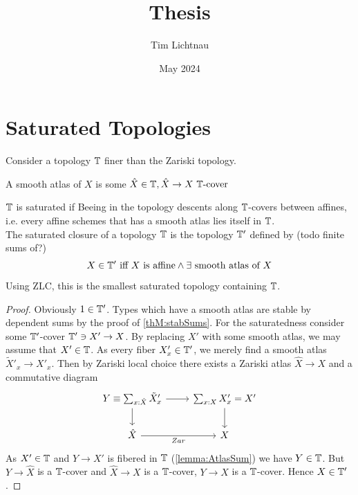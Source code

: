 \documentclass{article}
\title{Thesis}
\author{Tim Lichtnau }
\date{May 2024}
\begin{document}
\maketitle
\section{Saturated Topologies}
Consider a topology $\mathbb{T}$ finer than the Zariski topology.
\begin{definition}
    A smooth atlas of $X$ is  some $\hat X \in \mathbb{T} , \hat X \to X \text{ $\mathbb{T}$-cover }$
    \end{definition}
\begin{definition}
     $\mathbb{T}$ is saturated if Beeing in the topology descents along $\mathbb{T}$-covers between affines, i.e. every affine schemes that has a smooth atlas lies itself in $\mathbb{T}$. \\
    The saturated closure of a topology $\mathbb{T}$ is the topology $\mathbb{T}'$ defined by (todo finite sums of?)
    \[
    X \in \mathbb{T}' \text{ iff $X$ is affine} \land \exists \text{ smooth atlas of } X 
    \]
\end{definition}
\begin{lemma}
    Using ZLC, this is the smallest saturated topology containing $\mathbb{T}$.
\end{lemma}
\begin{proof}
Obviously $1 \in \mathbb{T}'$. Types which have a smooth atlas are stable by dependent sums by the proof of \ref{thM:stabSums}. For the saturatedness consider some $\mathbb{T}'$-cover $\mathbb{T}' \ni X' \to X$. By replacing $X'$ with some smooth atlas, we may assume that $X' \in \mathbb{T}$. As every fiber $X'_x \in \mathbb{T}'$, we merely find a smooth atlas $\tilde X'_x \to X'_x$. Then by Zariski local choice there exists a Zariski atlas $\hat X \to X$ and a commutative diagram 
\[\begin{tikzcd}
	Y \equiv {\sum_{x : \hat X}\tilde X'_x} & {\sum_{x : X}X'_x} = X' \\
	{\hat X} & X
	\arrow[from=1-1, to=1-2]
	\arrow[from=1-1, to=2-1]
	\arrow[from=1-2, to=2-2]
	\arrow["Zar"', from=2-1, to=2-2]
\end{tikzcd}\]
As $X' \in \mathbb{T}$ and $Y \to X'$ is fibered in $\mathbb{T}$ (\ref{lemma:AtlasSum}) we have $Y \in \mathbb{T}$. But $Y \to \hat X$ is a $\mathbb{T}$-cover and $\hat X \to X$ is a $\mathbb{T}$-cover, $Y \to X$ is a $\mathbb{T}$-cover. Hence $X \in \mathbb{T}'$.
\end{proof}
\end{document}
